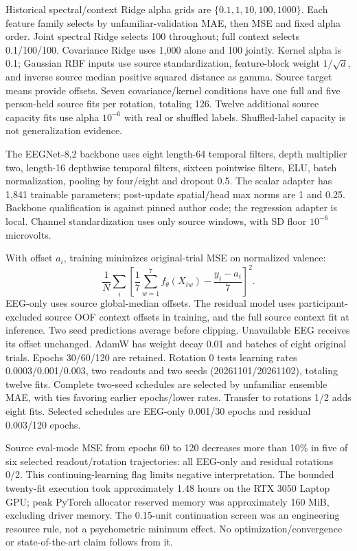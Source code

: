 \documentclass[10pt,a4paper]{article}
\begin{document}
Historical spectral/context Ridge alpha grids are \(\{0.1,1,10,100,1000\}\). Each feature family selects by unfamiliar-validation MAE, then MSE and fixed alpha order. Joint spectral Ridge selects 100 throughout; full context selects 0.1/100/100. Covariance Ridge uses 1,000 alone and 100 jointly. Kernel alpha is 0.1; Gaussian RBF inputs use source standardization, feature-block weight \(1/\sqrt d\), and inverse source median positive squared distance as gamma. Source target means provide offsets. Seven covariance/kernel conditions have one full and five person-held source fits per rotation, totaling 126. Twelve additional source capacity fits use alpha \(10^{-6}\) with real or shuffled labels. Shuffled-label capacity is not generalization evidence.

The EEGNet-8,2 backbone uses eight length-64 temporal filters, depth multiplier two, length-16 depthwise temporal filters, sixteen pointwise filters, ELU, batch normalization, pooling by four/eight and dropout 0.5. The scalar adapter has 1,841 trainable parameters; post-update spatial/head max norms are 1 and 0.25. Backbone qualification is against pinned author code; the regression adapter is local. Channel standardization uses only source windows, with SD floor \(10^{-6}\) microvolts.

With offset \(a_i\), training minimizes original-trial MSE on normalized valence:
\[
\frac{1}{N}\sum_i\left[\frac{1}{7}\sum_{w=1}^{7}f_\theta(X_{iw})-\frac{y_i-a_i}{7}\right]^2.
\]
EEG-only uses source global-median offsets. The residual model uses participant-excluded source OOF context offsets in training, and the full source context fit at inference. Two seed predictions average before clipping. Unavailable EEG receives its offset unchanged. AdamW has weight decay 0.01 and batches of eight original trials. Epochs 30/60/120 are retained. Rotation 0 tests learning rates 0.0003/0.001/0.003, two readouts and two seeds (20261101/20261102), totaling twelve fits. Complete two-seed schedules are selected by unfamiliar ensemble MAE, with ties favoring earlier epochs/lower rates. Transfer to rotations 1/2 adds eight fits. Selected schedules are EEG-only 0.001/30 epochs and residual 0.003/120 epochs.

Source eval-mode MSE from epochs 60 to 120 decreases more than 10\% in five of six selected readout/rotation trajectories: all EEG-only and residual rotations 0/2. This continuing-learning flag limits negative interpretation. The bounded twenty-fit execution took approximately 1.48 hours on the RTX 3050 Laptop GPU; peak PyTorch allocator reserved memory was approximately 160 MiB, excluding driver memory. The 0.15-unit continuation screen was an engineering resource rule, not a psychometric minimum effect. No optimization/convergence or state-of-the-art claim follows from it.
\end{document}
